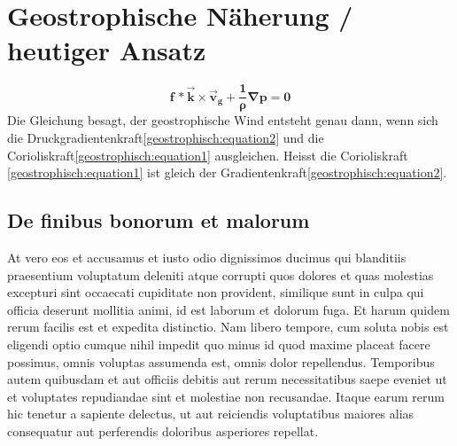 %
%
%
%
\section{Geostrophische Näherung / heutiger Ansatz
\label{geostrophisch:section:teil3}}
\begin{equation}
\boldsymbol{
f\, *\vec{k} \times \vec{v}_g 
+
\frac{1}{\rho} \nabla p
=
0
}
\label{geostrophisch:equation3}
\end{equation}
Die Gleichung besagt, der geostrophische Wind entsteht genau dann, wenn sich die Druckgradientenkraft\eqref{geostrophisch:equation2} und die Corioliskraft\eqref{geostrophisch:equation1} ausgleichen.
Heisst die Corioliskraft \eqref{geostrophisch:equation1} ist gleich der Gradientenkraft\eqref{geostrophisch:equation2}.




\subsection{De finibus bonorum et malorum
\label{geostrophisch:subsection:malorum}}
At vero eos et accusamus et iusto odio dignissimos ducimus qui
blanditiis praesentium voluptatum deleniti atque corrupti quos
dolores et quas molestias excepturi sint occaecati cupiditate non
provident, similique sunt in culpa qui officia deserunt mollitia
animi, id est laborum et dolorum fuga. Et harum quidem rerum facilis
est et expedita distinctio. Nam libero tempore, cum soluta nobis
est eligendi optio cumque nihil impedit quo minus id quod maxime
placeat facere possimus, omnis voluptas assumenda est, omnis dolor
repellendus. Temporibus autem quibusdam et aut officiis debitis aut
rerum necessitatibus saepe eveniet ut et voluptates repudiandae
sint et molestiae non recusandae. Itaque earum rerum hic tenetur a
sapiente delectus, ut aut reiciendis voluptatibus maiores alias
consequatur aut perferendis doloribus asperiores repellat.


